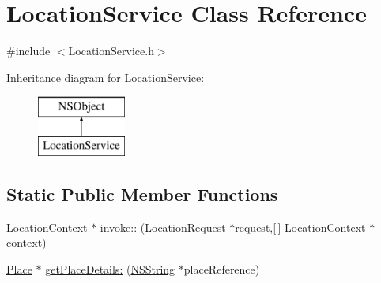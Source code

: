 \hypertarget{interface_location_service}{
\section{\-Location\-Service \-Class \-Reference}
\label{interface_location_service}
}


{\ttfamily \#include $<$\-Location\-Service.\-h$>$}

\-Inheritance diagram for \-Location\-Service\-:\begin{figure}[H]
\begin{center}
\leavevmode
\includegraphics[height=2.000000cm]{interface_location_service}
\end{center}
\end{figure}
\subsection*{\-Static \-Public \-Member \-Functions}
\begin{DoxyCompactItemize}
\item 
\hyperlink{interface_location_context}{\-Location\-Context} $\ast$ \hyperlink{interface_location_service_a08adf69c1ce72c8503595a061ec19d39}{invoke\-::} (\hyperlink{interface_location_request}{\-Location\-Request} $\ast$request,\mbox{[}$\,$\mbox{]} \hyperlink{interface_location_context}{\-Location\-Context} $\ast$context)
\item 
\hyperlink{interface_place}{\-Place} $\ast$ \hyperlink{interface_location_service_a3b615a66cfe302e44bc4c04e4ba84d6c}{get\-Place\-Details\-:} (\hyperlink{class_n_s_string}{\-N\-S\-String} $\ast$place\-Reference)
\end{DoxyCompactItemize}


